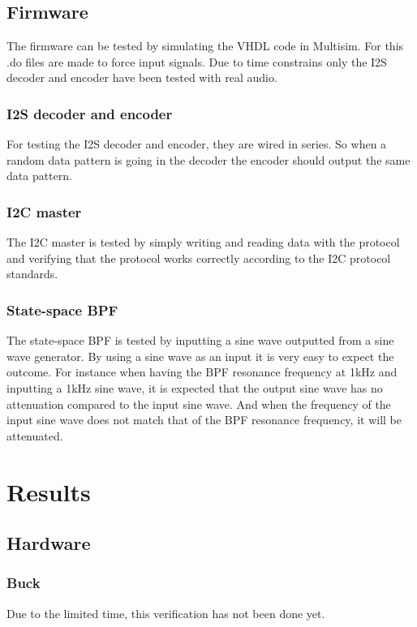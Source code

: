 \subsection{Firmware}
The firmware can be tested by simulating the VHDL code in Multisim. For this .do files are made to force input signals. Due to time constrains only the I2S decoder and encoder have been tested with real audio. 

\subsubsection{I2S decoder and encoder}
For testing the I2S decoder and encoder, they are wired in series. So when a random data pattern is going in the decoder the encoder should output the same data pattern.

\subsubsection{I2C master}
The I2C master is tested by simply writing and reading data with the protocol and verifying that the protocol works correctly according to the I2C protocol standards. 

\subsubsection{State-space BPF}
The state-space BPF is tested by inputting a sine wave outputted from a sine wave generator. By using a sine wave as an input it is very easy to expect the outcome. For instance when having the BPF resonance frequency at 1kHz and inputting a 1kHz sine wave, it is expected that the output sine wave has no attenuation compared to the input sine wave. And when the frequency of the input sine wave does not match that of the BPF resonance frequency, it will be attenuated. 

\section{Results}

\subsection{Hardware}

\subsubsection{Buck}
Due to the limited time, this verification has not been done yet.

